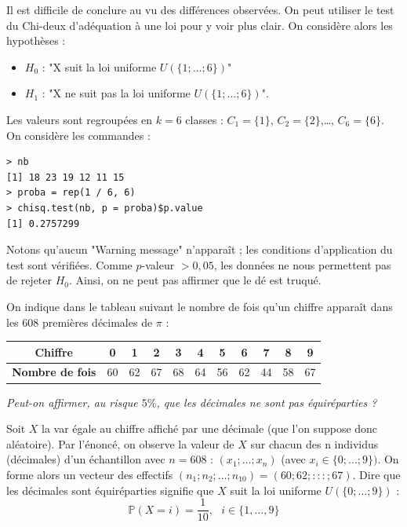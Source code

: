 Il est difficile de conclure au vu des différences observées.\newline
On peut utiliser le test du Chi-deux d'adéquation à une loi pour y voir plus clair. On considère alors les hypothèses :
\begin{itemize}
  \item $H_{0}$ : "X suit la loi uniforme $\mathit{U}(\{1; \dots ; 6\})$"
  \item $H_{1}$ : "X ne suit pas la loi uniforme $\mathit{U}(\{1; \dots ; 6\})$".
\end{itemize}
Les valeurs sont regroupées en $k = 6$ classes : $C_{1} = \{1\}$, $C_{2} = \{2\}$,\dots, $C_{6} = \{6\}$.\newline
On considère les commandes :
\begin{lstlisting}[language=html]
> nb
[1] 18 23 19 12 11 15
> proba = rep(1 / 6, 6)
> chisq.test(nb, p = proba)$p.value
[1] 0.2757299
\end{lstlisting}
Notons qu'aucun "Warning message" n'apparaît ; les conditions d'application du test sont vérifiées.\newline
Comme $p$-valeur $> 0,05$, les données ne nous permettent pas de rejeter $H_{0}$. Ainsi, on ne peut pas affirmer que le dé est truqué.



On indique dans le tableau suivant le nombre de fois qu'un chiffre apparaît dans les $608$ premières décimales de $\pi$ : 
\begin{center}
\begin{tabular}{|c|c|c|c|c|c|c|c|c|c|c|}
\hline
\textbf{Chiffre}        & 0  & 1  & 2  & 3  & 4  & 5  & 6  & 7  & 8  & 9  \\ \hline
\textbf{Nombre de fois} & 60 & 62 & 67 & 68 & 64 & 56 & 62 & 44 & 58 & 67 \\ \hline
\end{tabular}
\end{center}
\textit{Peut-on affirmer, au risque $5\%$, que les décimales ne sont pas équiréparties ?}



Soit $X$ la var égale au chiffre affiché par une décimale (que l'on suppose donc aléatoire).\newline
Par l'énoncé, on observe la valeur de $X$ sur chacun des n individus (décimales) d'un échantillon avec $n = 608$ : $(x_{1}; \dots ; x_{n})$ (avec $x_{i} \in \{0; \dots ; 9 \})$. On forme alors un vecteur des effectifs $(n_{1}; n_{2}; \dots ; n_{10}) = (60; 62; : : : ; 67)$. Dire que les décimales sont équiréparties signifie que $X$ suit la loi uniforme $\mathit{U}(\{0; \dots ; 9\})$ :
$$\mathbb{P}(X=i) = \frac{1}{10}, \textrm{ } i \in \{1,\dots, 9\}$$

